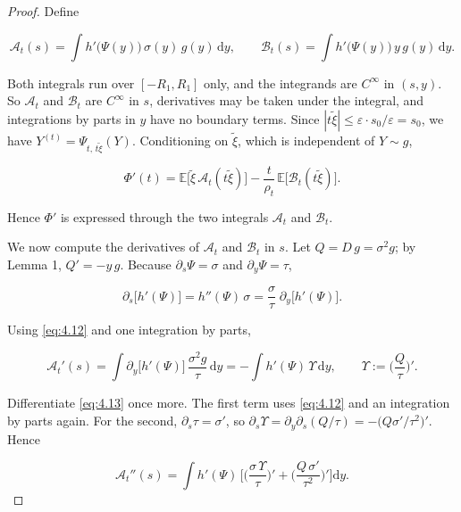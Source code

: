 \documentclass[aip,jmp,preprint,onecolumn,floatfix,superscriptaddress,nofootinbib,11pt]{revtex4-2}
\theoremstyle{plain}
\theoremstyle{remark}
\numberwithin{equation}{section}
\newcommand{\dd}{\mathrm{d}}
\newcommand{\E}{\mathbb{E}}
\newcommand{\eps}{\varepsilon}
\begin{document}
\begin{proof}
Define

\begin{equation*}
\mathcal A_t(s)=\int h'\big(\Psi(y)\big)\,\sigma(y)\,g(y)\,\dd y,\qquad \mathcal B_t(s)=\int h'\big(\Psi(y)\big)\,y\,g(y)\,\dd y .
\end{equation*}

Both integrals run over $[-R_1,R_1]$ only, and the integrands are $C^\infty$ in $(s,y)$. So $\mathcal A_t$ and $\mathcal B_t$ are $C^\infty$ in $s$, derivatives may be taken under the integral, and integrations by parts in $y$ have no boundary terms. Since $|t\tilde\xi|\le\eps\cdot s_0/\eps=s_0$, we have $Y^{(t)}=\Psi_{t,\,t\tilde\xi}(Y)$. Conditioning on $\tilde\xi$, which is independent of $Y\sim g$,

\begin{equation}
\Phi'(t)=\E\big[\tilde\xi\,\mathcal A_t(t\tilde\xi)\big]-\frac{t}{\rho_t}\,\E\big[\mathcal B_t(t\tilde\xi)\big].
\label{eq:4.11}
\end{equation}

Hence $\Phi'$ is expressed through the two integrals $\mathcal A_t$ and $\mathcal B_t$.

We now compute the derivatives of $\mathcal A_t$ and $\mathcal B_t$ in $s$. Let $Q=D\,g=\sigma^{2}g$; by Lemma 1, $Q'=-y\,g$. Because $\partial_s\Psi=\sigma$ and $\partial_y\Psi=\tau$,

\begin{equation}
\partial_s\big[h'(\Psi)\big]=h''(\Psi)\,\sigma=\frac{\sigma}{\tau}\;\partial_y\big[h'(\Psi)\big].
\label{eq:4.12}
\end{equation}

Using \eqref{eq:4.12} and one integration by parts,

\begin{equation}
\mathcal A_t'(s)=\int\partial_y\big[h'(\Psi)\big]\,\frac{\sigma^{2}g}{\tau}\,\dd y=-\int h'(\Psi)\,\Upsilon\,\dd y,\qquad \Upsilon:=\Big(\frac Q\tau\Big)' .
\label{eq:4.13}
\end{equation}

Differentiate \eqref{eq:4.13} once more. The first term uses \eqref{eq:4.12} and an integration by parts again. For the second, $\partial_s\tau=\sigma'$, so $\partial_s\Upsilon=\partial_y\partial_s(Q/\tau)=-\big(Q\sigma'/\tau^{2}\big)'$. Hence

\begin{equation}
\mathcal A_t''(s)=\int h'(\Psi)\,\Big[\Big(\frac{\sigma\,\Upsilon}{\tau}\Big)'+\Big(\frac{Q\,\sigma'}{\tau^{2}}\Big)'\Big]\dd y .
\label{eq:4.14}
\end{equation}


\end{proof}
\end{document}
